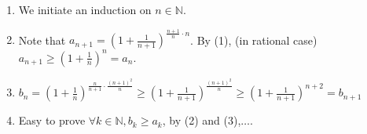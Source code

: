 \documentclass[12pt]{article}
\newcommand{\NN}{\mathbb{N}}
\begin{document}
\begin{enumerate}
    \item We initiate an induction on $n\in \NN$.
    \item Note that $a_{n+1}=\left( 1+\frac{1}{n+1}\right)^{\frac{n+1}{n}\cdot n}$. By (1), (in rational case) $a_{n+1}\ge \left(1+\frac{1}{n}\right)^n=a_n$.
    \item $b_n=\left(1+\frac{1}{n}\right)^{\frac{n}{n+1}\cdot\frac{(n+1)^2}{n}}\ge \left(1+\frac{1}{n+1}\right)^{\frac{(n+1)^2}{n}}\ge \left(1+\frac{1}{n+1}\right)^{n+2}=b_{n+1}$
    \item Easy to prove $\forall k\in \NN, b_k\ge a_k$, by (2) and (3),$\dots$.
\end{enumerate}
\end{document}
